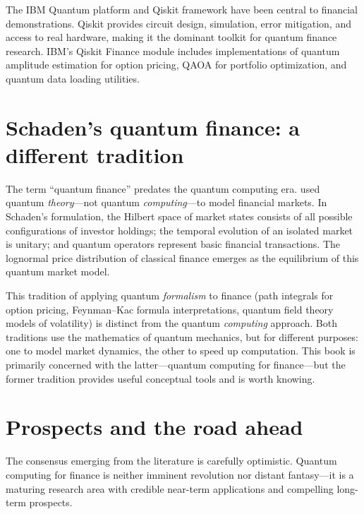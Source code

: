 The IBM Quantum platform and Qiskit framework \citep{pathak_evolution_2025,noauthor_quantum_nodate-1} have been central to financial demonstrations. Qiskit provides circuit design, simulation, error mitigation, and access to real hardware, making it the dominant toolkit for quantum finance research. IBM's Qiskit Finance module includes implementations of quantum amplitude estimation for option pricing, QAOA for portfolio optimization, and quantum data loading utilities.

\section{Schaden's quantum finance: a different tradition}

The term ``quantum finance'' predates the quantum computing era. \citet{schaden_quantum_2002} used quantum \emph{theory}---not quantum \emph{computing}---to model financial markets. In Schaden's formulation, the Hilbert space of market states consists of all possible configurations of investor holdings; the temporal evolution of an isolated market is unitary; and quantum operators represent basic financial transactions. The lognormal price distribution of classical finance emerges as the equilibrium of this quantum market model.

This tradition of applying quantum \emph{formalism} to finance (path integrals for option pricing, Feynman--Kac formula interpretations, quantum field theory models of volatility) is distinct from the quantum \emph{computing} approach. Both traditions use the mathematics of quantum mechanics, but for different purposes: one to model market dynamics, the other to speed up computation. This book is primarily concerned with the latter---quantum computing for finance---but the former tradition provides useful conceptual tools and is worth knowing.

\section{Prospects and the road ahead}

The consensus emerging from the literature is carefully optimistic. Quantum computing for finance is neither imminent revolution nor distant fantasy---it is a maturing research area with credible near-term applications and compelling long-term prospects.

